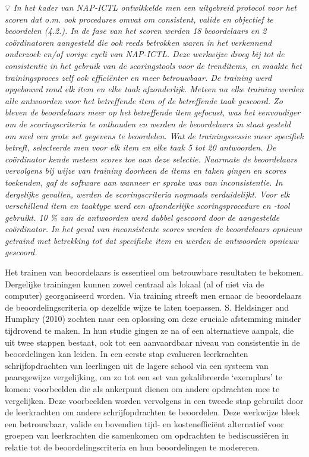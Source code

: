 \documentclass[
  letterpaper,
]{report}
\begin{document}
💡 \emph{In het kader van NAP-ICTL ontwikkelde men een uitgebreid
protocol voor het scoren dat o.m. ook procedures omvat om consistent,
valide en objectief te beoordelen (4.2.). In de fase van het scoren
werden 18 beoordelaars en 2 coördinatoren aangesteld die ook reeds
betrokken waren in het verkennend onderzoek en/of vorige cycli van
NAP-ICTL. Deze werkwijze droeg bij tot de consistentie in het gebruik
van de scoringstools voor de trenditems, en maakte het trainingsproces
zelf ook efficiënter en meer betrouwbaar. De training werd opgebouwd
rond elk item en elke taak afzonderlijk. Meteen na elke training werden
alle antwoorden voor het betreffende item of de betreffende taak
gescoord. Zo bleven de beoordelaars meer op het betreffende item
gefocust, was het eenvoudiger om de scoringscriteria te onthouden en
werden de beoordelaars in staat gesteld om snel een grote set gegevens
te beoordelen. Wat de trainingssessie meer specifiek betreft,
selecteerde men voor elk item en elke taak 5 tot 20 antwoorden. De
coördinator kende meteen scores toe aan deze selectie. Naarmate de
beoordelaars vervolgens bij wijze van training doorheen de items en
taken gingen en scores toekenden, gaf de software aan wanneer er sprake
was van inconsistentie. In dergelijke gevallen, werden de
scoringscriteria nogmaals verduidelijkt. Voor elk verschillend item en
taaktype werd een afzonderlijke scoringsprocedure en -tool gebruikt. 10
\% van de antwoorden werd dubbel gescoord door de aangestelde
coördinator. In het geval van inconsistente scores werden de
beoordelaars opnieuw getraind met betrekking tot dat specifieke item en
werden de antwoorden opnieuw gescoord.}

Het trainen van beoordelaars is essentieel om betrouwbare resultaten te
bekomen. Dergelijke trainingen kunnen zowel centraal als lokaal (al of
niet via de computer) georganiseerd worden. Via training streeft men
ernaar de beoordelaars de beoordelingscriteria op dezelfde wijze te
laten toepassen. S. Heldsinger and Humphry (2010) zochten naar een
oplossing om deze cruciale afstemming minder tijdrovend te maken. In hun
studie gingen ze na of een alternatieve aanpak, die uit twee stappen
bestaat, ook tot een aanvaardbaar niveau van consistentie in de
beoordelingen kan leiden. In een eerste stap evalueren leerkrachten
schrijfopdrachten van leerlingen uit de lagere school via een systeem
van paarsgewijze vergelijking, om zo tot een set van gekalibreerde
`exemplars' te komen: voorbeelden die als ankerpunt dienen om andere
opdrachten mee te vergelijken. Deze voorbeelden worden vervolgens in een
tweede stap gebruikt door de leerkrachten om andere schrijfopdrachten te
beoordelen. Deze werkwijze bleek een betrouwbaar, valide en bovendien
tijd- en kostenefficiënt alternatief voor groepen van leerkrachten die
samenkomen om opdrachten te bediscussiëren in relatie tot de
beoordelingscriteria en hun beoordelingen te modereren.
\end{document}
